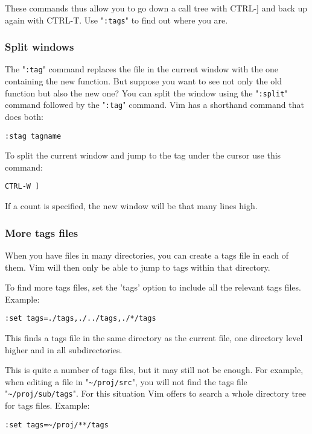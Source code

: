 These commands thus allow you to go down a call tree with CTRL-] and back up again with CTRL-T.
Use "\verb!:tags!" to find out where you are.
\subsubsection{Split windows}
The "\verb!:tag!" command replaces the file in the current window with the one containing the new function.
But suppose you want to see not only the old function but also the new one?  You can split the window using the "\verb!:split!" command followed by the "\verb!:tag!" command.
Vim has a shorthand command that does both:

\begin{Verbatim}[samepage=true]
 :stag tagname
\end{Verbatim}

To split the current window and jump to the tag under the cursor use this command:

\begin{Verbatim}[samepage=true]
 CTRL-W ]
\end{Verbatim}

If a count is specified, the new window will be that many lines high.
\subsubsection{More tags files}
When you have files in many directories, you can create a tags file in each of them.
Vim will then only be able to jump to tags within that directory.

To find more tags files, set the 'tags' option to include all the relevant tags files.
Example:

\begin{Verbatim}[samepage=true]
 :set tags=./tags,./../tags,./*/tags
\end{Verbatim}

This finds a tags file in the same directory as the current file, one directory level higher and in all subdirectories.

This is quite a number of tags files, but it may still not be enough.
For example, when editing a file in "\verb!~/proj/src!", you will not find the tags file "\verb!~/proj/sub/tags!".
For this situation Vim offers to search a whole directory tree for tags files.
Example:

\begin{Verbatim}[samepage=true]
 :set tags=~/proj/**/tags
\end{Verbatim}
